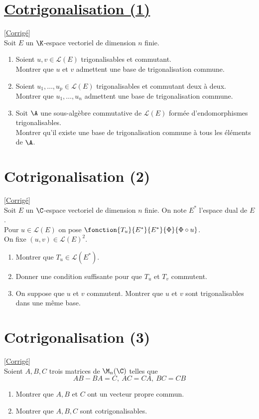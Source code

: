\documentclass[8pt]{book}
\begin{document}
	\section{\underline {Cotrigonalisation (1)} }
	\label{Cotrigonalisation (1)}
	\textcolor{blue}{\hyperref[Cotrigonalisation (1) corrigé]{[Corrigé]}}\\
	Soit $E$ un $\K$-espace vectoriel de dimension $n$ finie.
	\begin{enumerate}
		\item  Soient $u,v\in \mathcal L(E)$ trigonalisables et commutant. \\Montrer que $u$ et $v$ admettent une base de trigonalisation commune.
		\item Soient $u_1,\dots,u_p\in \mathcal L(E)$ trigonalisables et commutant deux à deux.\\ Montrer que $u_1,\dots,u_n$ admettent une base de trigonalisation commune.
		\item Soit $\A$ une sous-algèbre commutative de $\mathcal L(E)$ formée d'endomorphismes trigonalisables.\\
		Montrer qu'il existe une base de trigonalisation commune à tous les éléments de $\A$.
	\end{enumerate}
	
	\section{Cotrigonalisation (2) }
	\label{Cotrigonalisation (2)}
	\textcolor{blue}{\hyperref[Cotrigonalisation (2) corrigé]{[Corrigé]}}\\
	Soit $E$ un $\C$-espace vectoriel de dimension $n$ finie. On note $E^*$ l'espace dual de $E$.\\
	Pour $u\in \mathcal L(E)$ on pose $\fonction{T_u}{E^*}{E^*}{\Phi}{\Phi\circ u}$.\\
	On fixe $(u,v)\in \mathcal L(E)^2$.
	\begin{enumerate}
		\item Montrer que $T_u\in \mathcal L(E^*)$.
		\item Donner une condition suffisante pour que $T_u$ et $T_v$ commutent.
		\item On suppose que $u$ et $v$ commutent. Montrer que $u$ et $v$ sont trigonalisables dans une même base.
	\end{enumerate}
	
	\section{Cotrigonalisation (3) }
	\label{Cotrigonalisation (3)}
	\textcolor{blue}{\hyperref[Cotrigonalisation (3) corrigé]{[Corrigé]}}\\
	Soient $A,B,C$ trois matrices de $\M_n(\C)$ telles que
	$$AB-BA=C,\ AC=CA,\ BC=CB$$
	\begin{enumerate}
		\item Montrer que $A,B$ et $C$ ont un vecteur propre commun.
		\item Montrer que $A,B,C$ sont cotrigonalisables.
	\end{enumerate}
	
\end{document}
